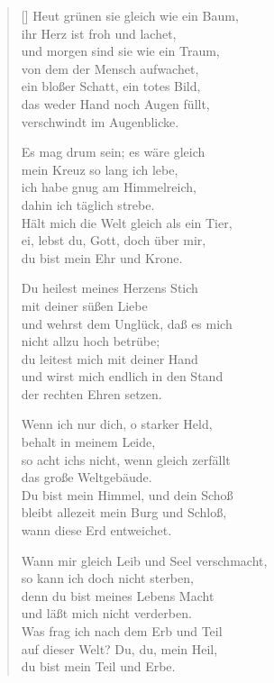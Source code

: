 \begin{multicols}{2}
\begin{verse}[\versewidth]
 Heut grünen sie gleich wie ein Baum,\\
ihr Herz ist froh und lachet,\\
und morgen sind sie wie ein Traum,\\
von dem der Mensch aufwachet,\\
ein bloßer Schatt, ein totes Bild,\\
das weder Hand noch Augen füllt,\\
verschwindt im Augenblicke.

 Es mag drum sein; es wäre gleich\\
mein Kreuz so lang ich lebe,\\
ich habe gnug am Himmelreich,\\
dahin ich täglich strebe.\\
Hält mich die Welt gleich als ein Tier,\\
ei, lebst du, Gott, doch über mir,\\
du bist mein Ehr und Krone.

 Du heilest meines Herzens Stich\\
mit deiner süßen Liebe\\
und wehrst dem Unglück, daß es mich\\
nicht allzu hoch betrübe;\\
du leitest mich mit deiner Hand\\
und wirst mich endlich in den Stand\\
der rechten Ehren setzen.

 Wenn ich nur dich, o starker Held,\\
behalt in meinem Leide,\\
so acht ichs nicht, wenn gleich zerfällt\\
das große Weltgebäude.\\
Du bist mein Himmel, und dein Schoß\\
bleibt allezeit mein Burg und Schloß,\\
wann diese Erd entweichet.

 Wann mir gleich Leib und Seel verschmacht,\\
so kann ich doch nicht sterben,\\
denn du bist meines Lebens Macht\\
und läßt mich nicht verderben.\\
Was frag ich nach dem Erb und Teil\\
auf dieser Welt? Du, du, mein Heil,\\
du bist mein Teil und Erbe.


\end{verse}
\end{multicols}
